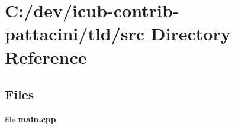 \section{C\+:/dev/icub-\/contrib-\/pattacini/tld/src Directory Reference}
\label{dir_20fa3fc76fbc47fba8d45ed812c1fa7f}
\subsection*{Files}
\begin{DoxyCompactItemize}
\item 
file {\bfseries main.\+cpp}
\end{DoxyCompactItemize}
